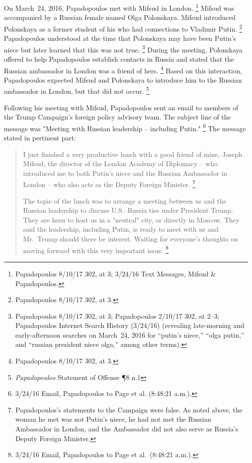 On March~24, 2016, Papadopoulos met with Mifsud in London.%
\footnote{Papadopoulos 8/10/17 302, at 3; 3/24/16 Text Messages, Mifsud \& Papadopoulos.}
Mifsud was accompanied by a Russian female named Olga Polonskaya.
Mifsud introduced Polonskaya as a former student of his who had connections to Vladimir Putin.%
\footnote{Papadopoulos 8/10/17 302, at 3.}
Papadopoulos understood at the time that Polonskaya may have been Putin's niece but later learned that this was not true.%
\footnote{Papadopoulos 8/10/17 302, at 3;
Papadopoulos 2/10/17 302, at 2--3;
Papadopoulos Internet Search History (3/24/16) (revealing late-morning and early-afternoon searches on March~24, 2016 for “putin's niece,” “olga putin,” and “russian president niece olga,” among other terms).}
During the meeting, Polonskaya offered to help Papadopoulos establish contacts in Russia and stated that the Russian ambassador in London was a friend of hers.%
\footnote{Papadopoulos 8/10/17 302, at 3.}
Based on this interaction, Papadopoulos expected Mifsud and Polonskaya to introduce him to the Russian ambassador in London, but that did not occur.%
\footnote{\textit{Papadopoulos} Statement of Offense \P 8 n.1}

Following his meeting with Mifsud, Papadopoulos sent an email to members of the Trump Campaign's foreign policy advisory team. The subject line of the message was "Meeting with Russian leadership -- including Putin."%
\footnote{3/24/16 Email, Papadopoulos to Page et al. (8:48:21 a.m.).}
The message stated in pertinent part:

\begin{quote}
I just finished a very productive lunch with a good friend of mine, Joseph Mifsud, the director of the London Academy of Diplomacy -- who introduced me to both Putin's niece and the Russian Ambassador in London -- who also acts as the Deputy Foreign Minister.%
\footnote{Papadopoulos's statements to the Campaign were false.
As noted above, the woman he met was not Putin's niece, he had not met the Russian Ambassador in London, and the Ambassador did not also serve as Russia's Deputy Foreign Minister.}

The topic of the lunch was to arrange a meeting between us and the Russian leadership to discuss U.S.--Russia ties under President Trump.
They are keen to host us in a "neutral" city, or directly in Moscow.
They said the leadership, including Putin, is ready to meet with us and Mr.~Trump should there be interest.
Waiting for everyone's thoughts on moving forward with this very important issue.%
\footnote{3/24/16 Email, Papadopoulos to Page et al.\ (8:48:21 a.m.).}
\end{quote}

